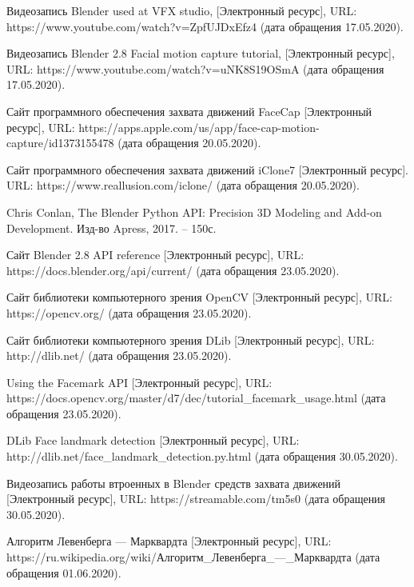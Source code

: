 \begingroup 
\renewcommand{\section}[2]{\anonsection{Список использованных источников}}
\begin{thebibliography}{00}
	Видеозапись Blender used at VFX studio,
	[Электронный ресурс],
	URL: https://www.youtube.com/watch?v=ZpfUJDxEfz4
	(дата обращения 17.05.2020).

    Видеозапись Blender 2.8 Facial motion capture tutorial,
    [Электронный ресурс],
    URL: https://www.youtube.com/watch?v=uNK8S19OSmA
    (дата обращения 17.05.2020).
    
	Сайт программного обеспечения захвата движений FaceCap
	[Электронный ресурс],
	URL: https://apps.apple.com/us/app/face-cap-motion-capture/id1373155478
	(дата обращения 20.05.2020).

	Сайт программного обеспечения захвата движений iClone7
	[Электронный ресурс].
	URL: https://www.reallusion.com/iclone/
	(дата обращения 20.05.2020).
    
	Chris Conlan,
	The Blender Python API: Precision 3D Modeling and Add-on Development.
	Изд-во Apress, 2017. -- 150с.
	

	Сайт Blender 2.8 API reference
	[Электронный ресурс],
	URL: https://docs.blender.org/api/current/
	(дата обращения 23.05.2020).
	
	Сайт библиотеки компьютерного зрения OpenCV
	[Электронный ресурс],
	URL: https://opencv.org/
	(дата обращения 23.05.2020).
	
	Сайт библиотеки компьютерного зрения DLib
	[Электронный ресурс],
	URL: http://dlib.net/
	(дата обращения 23.05.2020).
	
	Using the Facemark API
	[Электронный ресурс],
	URL: https://docs.opencv.org/master/d7/dec/tutorial\_facemark\_usage.html
	(дата обращения 23.05.2020).

	DLib Face landmark detection
	[Электронный ресурс],
	URL: http://dlib.net/face\_landmark\_detection.py.html
	(дата обращения 30.05.2020).
	
	Видеозапись работы втроенных в Blender средств захвата движений
	[Электронный ресурс],
	URL: https://streamable.com/tm5s0
	(дата обращения 30.05.2020).
	
	Алгоритм Левенберга — Марквардта
	[Электронный ресурс],
	URL: https://ru.wikipedia.org/wiki/Алгоритм\_Левенберга\_—\_Марквардта
	(дата обращения 01.06.2020).
	

\end{thebibliography}
